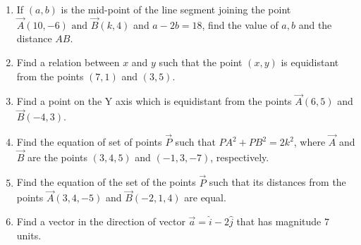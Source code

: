 \begin{enumerate}[label=\thesubsection.\arabic*, ref=\thesubsection.\theenumi]
\item If $(a, b)$ is the mid-point of the line segment joining the point $\vec{A}(10, -6)\text{ and }\vec{B}(k, 4)$ and $a-2b=18$,  find the value of $a, b$ and the distance $AB$.
\item Find a relation between $x$ and $y$ such that the point $(x,y)$ is equidistant from the points $(7,1)$ and $(3,5)$.
\item Find a point on the Y axis which is equidistant from the points $\vec{A}(6,5)$ and $\vec{B}(-4,3)$.
\item Find the equation of set of points $\vec{P}$ such that $PA^2+PB^2=2k^2$, where $\vec{A}$ and $\vec{B}$ are the points $(3,4,5)$ and $(-1,3,-7)$, respectively.
\item Find the equation of the set of the points $\vec{P}$ such that its distances from the points $\vec{A}(3,4,-5)$ and $\vec{B}(-2,1,4)$ are equal.
\item Find a vector in the direction of vector $\overrightarrow{a}=\hat{i} -2\hat{j}$ that has magnitude $7$ units.
\end{enumerate}
